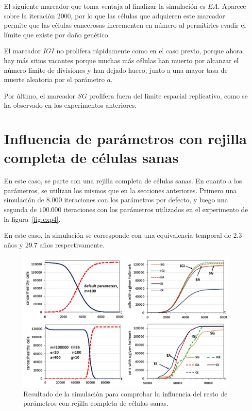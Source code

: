 El siguiente marcador que toma ventaja al finalizar la simulación es $EA$. Aparece sobre la iteración 2000,
por lo que las células que adquieren este marcador permite que las células cancerosas incrementen en número
al permitirles evadir el límite que existe por daño genético.

El marcador $IGI$ no prolifera rápidamente como en el caso previo, porque ahora hay más sitios vacantes
porque muchas más células han muerto por alcanzar el número límite de divisiones y han dejado hueco,
junto a una mayor tasa de muerte aleatoria por el parámetro $a$.

Por último, el marcador $SG$ prolifera fuera del límite espacial replicativo, como
se ha observado en los experimentos anteriores.

\section{Influencia de parámetros con rejilla completa de células sanas}

En este caso, se parte con una rejilla completa de células sanas. En cuanto a los parámetros,
se utilizan los mismos que en la secciones anteriores. Primero una simulación de $8.000$ iteraciones
con los parámetros por defecto, y luego una segunda de $100.000$ iteraciones con los parámetros
utilizados en el experimento de la figura~\ref{fig:exp4}.

En este caso, la simulación se corresponde con una equivalencia temporal
de $2.3$ años y $29.7$ años respectivamente.

\begin{figure}[h]
\centering
\includegraphics[scale=0.5]{figures/experiments/exp5}
\caption{Resultado de la simulación para comprobar la influencia del resto de parámetros con rejilla completa de células sanas.}
\label{fig:exp5}
\end{figure}

